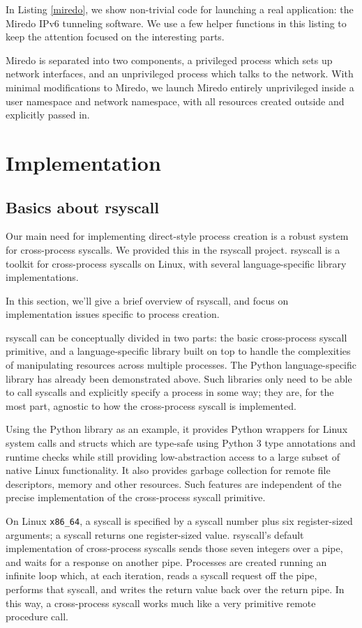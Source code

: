 \documentclass{acmart}
\begin{document}
In Listing \ref{miredo},
we show non-trivial code for launching a real application:
the Miredo IPv6 tunneling software.
We use a few helper functions in this listing to keep the attention focused on the interesting parts.

Miredo is separated into two components, a privileged process which sets up network interfaces,
and an unprivileged process which talks to the network.
With minimal modifications to Miredo,
we launch Miredo entirely unprivileged inside a user namespace and network namespace,
with all resources created outside and explicitly passed in.
\section{Implementation}\label{implementation}
\subsection{Basics about rsyscall}
Our main need for implementing direct-style process creation
is a robust system for cross-process syscalls.
We provided this in the rsyscall project.
rsyscall is a toolkit for cross-process syscalls on Linux,
with several language-specific library implementations.

In this section, we'll give a brief overview of rsyscall,
and focus on implementation issues specific to process creation.

rsyscall can be conceptually divided in two parts:
the basic cross-process syscall primitive,
and a language-specific library built on top
to handle the complexities of manipulating resources across multiple processes.
The Python language-specific library has already been demonstrated above.
Such libraries only need to be able to call syscalls and explicitly specify a process in some way;
they are, for the most part, agnostic to how the cross-process syscall is implemented.

Using the Python library as an example,
it provides Python wrappers for Linux system calls and structs
which are type-safe using Python 3 type annotations and runtime checks
while still providing low-abstraction access to a large subset of native Linux functionality.
It also provides garbage collection for remote file descriptors, memory and other resources.
Such features are independent of the precise implementation of the cross-process syscall primitive.

On Linux \verb|x86_64|, a syscall is specified by a syscall number plus six register-sized arguments;
a syscall returns one register-sized value.
rsyscall's default implementation of cross-process syscalls sends those seven integers over a pipe,
and waits for a response on another pipe.
Processes are created running an infinite loop which, at each iteration,
reads a syscall request off the pipe,
performs that syscall,
and writes the return value back over the return pipe.
In this way, a cross-process syscall works much like a very primitive remote procedure call.
\end{document}
